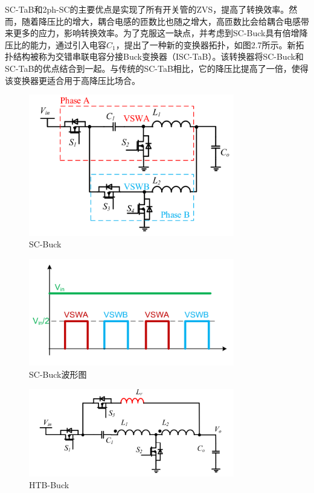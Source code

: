\documentclass[12pt,a4paper]{report}
\begin{document}
SC-TaB和2ph-SC的主要优点是实现了所有开关管的ZVS，提高了转换效率。然而，随着降压比的增大，耦合电感的匝数比也随之增大，高匝数比会给耦合电感带来更多的应力，影响转换效率。为了克服这一缺点，并考虑到SC-Buck具有倍增降压比的能力，通过引入电容$C_1$，提出了一种新的变换器拓扑，如图2.7所示。新拓扑结构被称为交错串联电容分接Buck变换器（ISC-TaB）。该转换器将SC-Buck和SC-TaB的优点结合到一起。与传统的SC-TaB相比，它的降压比提高了一倍，使得该变换器更适合用于高降压比场合。
\begin{figure}[h]
    \centering
    \includegraphics[width = 0.8\textwidth]{figures/SC-Buck.png}
    \caption{SC-Buck}
\end{figure}
\begin{figure}[h]
    \centering
    \includegraphics[width = 0.8\textwidth]{figures/SC-Buck_v.png}
    \caption{SC-Buck波形图}
\end{figure}
\begin{figure}[h]
    \centering
    \includegraphics[width = 0.8\textwidth]{figures/HTB-Buck.png}
    \caption{HTB-Buck}
\end{figure}
\end{document}
